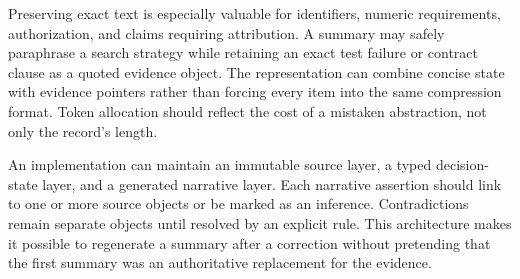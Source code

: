 Preserving exact text is especially valuable for identifiers, numeric requirements, authorization, and claims requiring attribution. A summary may safely paraphrase a search strategy while retaining an exact test failure or contract clause as a quoted evidence object. The representation can combine concise state with evidence pointers rather than forcing every item into the same compression format. Token allocation should reflect the cost of a mistaken abstraction, not only the record's length.

An implementation can maintain an immutable source layer, a typed decision-state layer, and a generated narrative layer. Each narrative assertion should link to one or more source objects or be marked as an inference. Contradictions remain separate objects until resolved by an explicit rule. This architecture makes it possible to regenerate a summary after a correction without pretending that the first summary was an authoritative replacement for the evidence.

